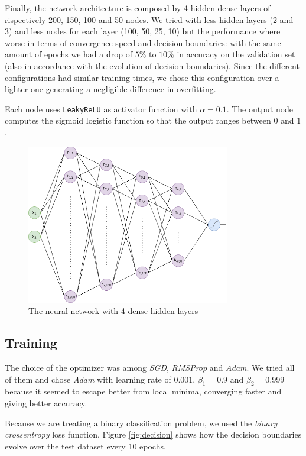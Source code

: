 \documentclass[compsoc]{IEEEtran}
\begin{document}
Finally, the network architecture is composed by 4 hidden dense layers of rispectively 200, 150, 100 and 50 nodes. We tried with less hidden layers (2 and 3) and less nodes for each
layer (100, 50, 25, 10) but the performance where worse in terms of convergence speed and decision boundaries: 
with the same amount of epochs we had a drop of $5\%$ to $10\%$ in accuracy on the validation set (also in accordance with the evolution of decision boundaries).
Since the different configurations had similar training times, we chose this configuration over a lighter one generating a negligible difference in overfitting. \par

Each node uses \texttt{LeakyReLU} as activator function with $\alpha=0.1$. The output node computes the sigmoid logistic function so that the output ranges between $0$ and $1$.

\begin{figure}[ht!]
\centering                                                                        
\includegraphics[width=3.5in]{../images/nn-1.png}
\captionsetup{justification=centering}                                                                                                                                   
\caption{The neural network with 4 dense hidden layers}
\label{fig:nn}                                                                                                                                                           
\end{figure}

\subsection{Training}
The choice of the optimizer was among \emph{SGD}, \emph{RMSProp} and \emph{Adam}. We tried all of them and chose \emph{Adam} 
with learning rate of $0.001$, $\beta_{1}=0.9$ and $\beta_{2}=0.999$ because it seemed to escape better from local minima, converging faster and giving better accuracy. \par
Because we are treating a binary classification problem, we used the \emph{binary crossentropy} loss function.
Figure \ref{fig:decision} shows how the decision boundaries evolve over the test dataset every 10 epochs.
\end{document}
